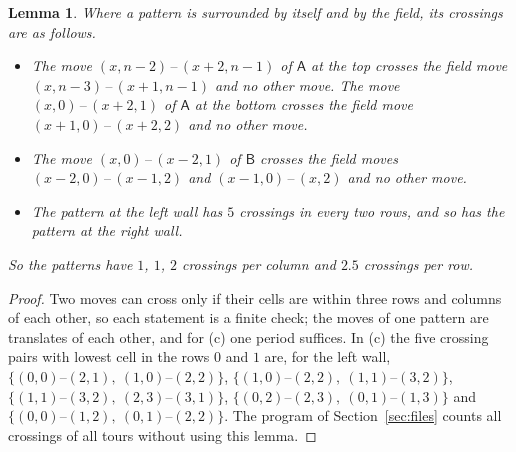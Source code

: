 \documentclass[11pt]{amsart}
\newtheorem{lemma}[theorem]{Lemma}
\theoremstyle{remark}
\begin{document}
\begin{lemma}\label{lem:cross}
Where a pattern is surrounded by itself and by the field, its crossings are as follows.
\begin{itemize}
\item[(a)] The move $(x,n-2)\,\text{--}\,(x+2,n-1)$ of $\mathsf A$ at the top crosses the field move
$(x,n-3)\,\text{--}\,(x+1,n-1)$ and no other move. The move $(x,0)\,\text{--}\,(x+2,1)$ of $\mathsf A$ at the bottom
crosses the field move $(x+1,0)\,\text{--}\,(x+2,2)$ and no other move.
\item[(b)] The move $(x,0)\,\text{--}\,(x-2,1)$ of $\mathsf B$ crosses the field moves $(x-2,0)\,\text{--}\,(x-1,2)$
and $(x-1,0)\,\text{--}\,(x,2)$ and no other move.
\item[(c)] The pattern at the left wall has $5$ crossings in every two rows, and so has the pattern at the right
wall.
\end{itemize}
So the patterns have $1$, $1$, $2$ crossings per column and $2.5$ crossings per row.
\end{lemma}
\begin{proof}
Two moves can cross only if their cells are within three rows and columns of each other, so each statement is a
finite check; the moves of one pattern are translates of each other, and for (c) one period suffices. In (c) the
five crossing pairs with lowest cell in the rows $0$ and $1$ are, for the left wall,
$\{(0,0)\text{--}(2,1),\ (1,0)\text{--}(2,2)\}$, $\{(1,0)\text{--}(2,2),\ (1,1)\text{--}(3,2)\}$,
$\{(1,1)\text{--}(3,2),\ (2,3)\text{--}(3,1)\}$, $\{(0,2)\text{--}(2,3),\ (0,1)\text{--}(1,3)\}$ and
$\{(0,0)\text{--}(1,2),\ (0,1)\text{--}(2,2)\}$. The program of Section~\ref{sec:files} counts all crossings of all
tours without using this lemma.
\end{proof}
\end{document}
